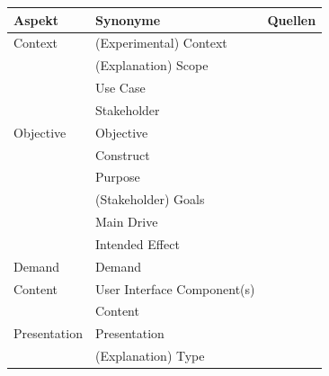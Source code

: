 \begin{table}
        \begin{tabular}{|p{}|p{}|p{}|}
            \hline
            \textbf{Aspekt}          & \textbf{Synonyme} & \textbf{Quellen} \\ \hline
            Context         & (Experimental) Context & \cite{chazette_knowledge_nodate} \cite{chazette_end-users_nodate} \cite{sato_context_nodate} \cite{waa_evaluating_2021} \cite{kohl_explainability_2019} \cite{neerincx_using_2018} \cite{sovrano_modelling_2020} \cite{doshi2017towards} \\
                            & (Explanation) Scope & \cite{wohlin2012experimentation} \cite{eiband_impact_2019} \cite{doshi2017towards} \\
                            & Use Case & \cite{waa_evaluating_2021} \\
                            & Stakeholder & \cite{rosenfeld_explainability_2019} \\
            \hline
            Objective       & Objective & \cite{nunes_systematic_2017} \\
                            & Construct & \cite{waa_evaluating_2021} \\
                            & Purpose & \cite{nunes_systematic_2017} \cite{wohlin2012experimentation} \\
                            & (Stakeholder) Goals & \cite{cirqueira_scenario-based_2020} \cite{sovrano_modelling_2020} \cite{ribera2019can} \\
                            & Main Drive & \cite{anjomshoae2019explainable} \\
                            & Intended Effect & \cite{balog_measuring_2020} \\
            \hline
            Demand          & Demand            & \cite{chazette_knowledge_nodate} \\
            \hline
            Content         & User Interface Component(s) & \cite{nunes_systematic_2017}
                                                            \cite{rosenfeld_explainability_2019} \\
                            & Content               & \cite{ribera2019can} \\
            \hline
            Presentation    & Presentation          & \cite{rosenfeld_explainability_2019} \\
                            & (Explanation) Type    & \cite{ribera2019can} \cite{rosenfeld_explainability_2019} \\

\end{tabular}
\end{table}
